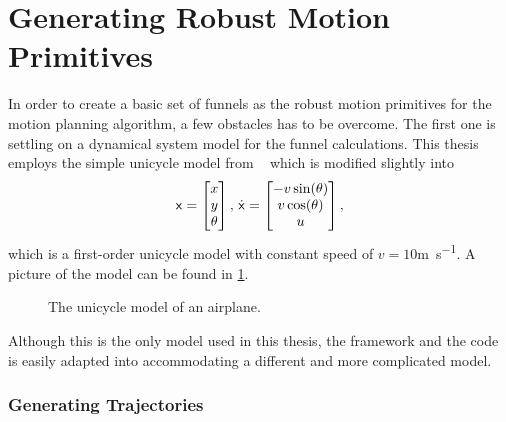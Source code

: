 \section{Generating Robust Motion Primitives}
\label{sec:generating-robust-motion-primitives}

In order to create a basic set of funnels as the robust motion primitives for
the \rrtfunnel{} motion planning algorithm, a few obstacles has to be overcome.
The first one is settling on a dynamical system model for the funnel
calculations. This thesis employs the simple unicycle model from
\citeauthor{Lav06}~\cite[613]{Lav06} which is modified slightly into
\begin{equation}
  \label{eq:model-dynamics}
  {\mathbf{\mathsf{x}}} =
  \begin{bmatrix}
    x \\ y \\ \theta \\
  \end{bmatrix}, \, \dot{{\mathbf{\mathsf{x}}}} =
  \begin{bmatrix}
    -v \sin(\theta) \\
    v \cos(\theta) \\
    u \\
  \end{bmatrix}
  ,
\end{equation}
which is a first-order unicycle model with constant speed of
\(v=10\)\si{m.s^{-1}}. A picture of the model can be found in
\cref{fig:second-order-unicycle}.
\begin{figure}
  \caption{The unicycle model of an airplane.}
  \label{fig:second-order-unicycle}
\end{figure}
Although this is the only model used in this thesis, the framework and the code
is easily adapted into accommodating a different and more complicated model.

\subsubsection{Generating Trajectories}
\label{subsec:generating-the-trajectories}

